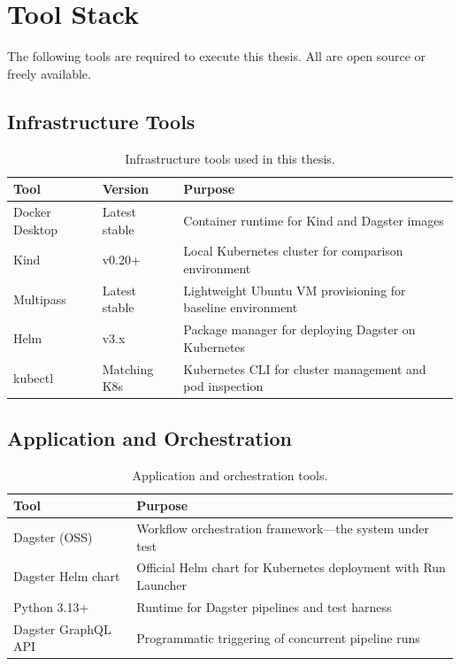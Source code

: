 
\section{Tool Stack}
\label{sec:tools}

The following tools are required to execute this thesis. All are open source or freely available.

\subsection{Infrastructure Tools}
\label{subsec:infra-tools}

\begin{table}[H]
  \centering
  \caption{Infrastructure tools used in this thesis.}
  \label{tab:infra-tools}
  \small
  \begin{tabularx}{\textwidth}{llX}
    \toprule
    \textbf{Tool} & \textbf{Version} & \textbf{Purpose} \\
    \midrule
    Docker Desktop  & Latest stable   & Container runtime for Kind and Dagster images \\
    Kind            & v0.20+          & Local Kubernetes cluster for comparison environment \\
    Multipass       & Latest stable   & Lightweight Ubuntu VM provisioning for baseline environment \\
    Helm            & v3.x            & Package manager for deploying Dagster on Kubernetes \\
    kubectl         & Matching K8s    & Kubernetes CLI for cluster management and pod inspection \\
    \bottomrule
  \end{tabularx}
\end{table}

\subsection{Application and Orchestration}
\label{subsec:app-tools}

\begin{table}[H]
  \centering
  \caption{Application and orchestration tools.}
  \label{tab:app-tools}
  \small
  \begin{tabularx}{\textwidth}{lX}
    \toprule
    \textbf{Tool} & \textbf{Purpose} \\
    \midrule
    Dagster (OSS)           & Workflow orchestration framework---the system under test \\
    Dagster Helm chart      & Official Helm chart for Kubernetes deployment with Run Launcher \\
    Python 3.13+            & Runtime for Dagster pipelines and test harness \\
    Dagster GraphQL API     & Programmatic triggering of concurrent pipeline runs \\
    \bottomrule
  \end{tabularx}
\end{table}

